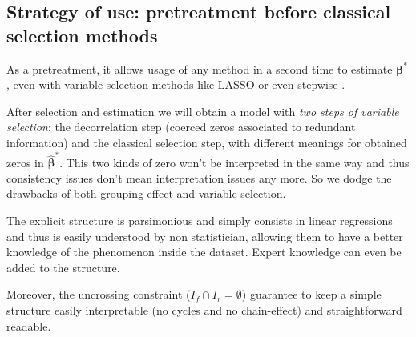 \documentclass[11pt,a4paper]{article}
\begin{document}
\subsection{Strategy of use: pretreatment before classical selection methods}\label{interpretation}
As a pretreatment, it allows usage of any method in a second time to estimate $\boldsymbol{\beta}^*$, even with variable selection methods like LASSO or even stepwise \cite{seber2012linear}.

After selection and estimation we will obtain a model with { \it two steps of variable selection}: the decorrelation step (coerced zeros associated to redundant information) and the classical selection step, with different meanings for obtained zeros in $\hat{\boldsymbol{\beta}}^*$. 
 This two kinds of zero won't be interpreted in the same way and thus consistency issues don't mean interpretation issues any more. So we dodge the drawbacks of both grouping effect and variable selection.


The explicit structure is parsimonious and simply consists in linear regressions and thus is easily understood by non statistician, allowing them to have a better knowledge of the phenomenon inside the dataset. Expert knowledge can even be added to the structure.

Moreover, the uncrossing constraint ($I_f\cap I_r=\emptyset$) guarantee to keep a simple structure easily interpretable (no cycles and no chain-effect) and straightforward readable.
\end{document}
